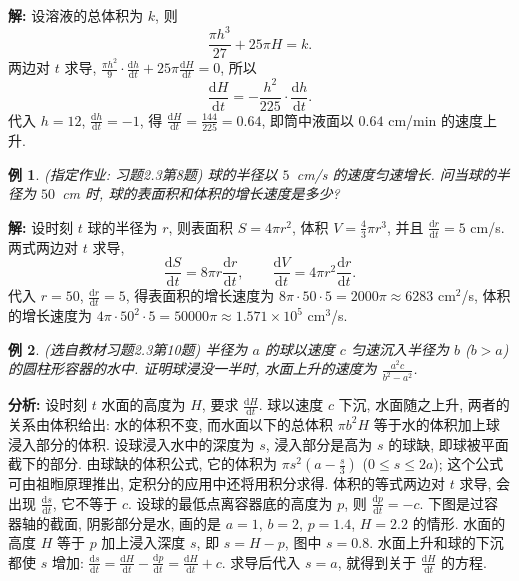 \documentclass[UTF8,openany]{ctexbook}
\theoremstyle{chinesetextbook}
\newtheorem{example}{例}[section]
\newenvironment{cnsolution}{\par\indent\textbf{解:} \ignorespaces}{\par}
\newcommand{\dd}{\mathrm d}
\begin{document}
\begin{cnsolution}
设溶液的总体积为 $k$, 则
\[
\frac{\pi h^3}{27}+25\pi H=k.
\]
两边对 $t$ 求导, $\displaystyle\frac{\pi h^2}9\cdot\frac{\dd h}{\dd t}+25\pi\frac{\dd H}{\dd t}=0$, 所以
\[
\frac{\dd H}{\dd t}=-\frac{h^2}{225}\cdot\frac{\dd h}{\dd t}.
\]
代入 $h=12$, $\displaystyle\frac{\dd h}{\dd t}=-1$, 得 $\displaystyle\frac{\dd H}{\dd t}=\frac{144}{225}=0.64$, 即筒中液面以 $0.64$ cm/min 的速度上升.
\end{cnsolution}
\begin{example}\label{ex:c2-h3-8}
\textnormal{(指定作业: 习题2.3第8题)} 球的半径以 $5$~cm/s 的速度匀速增长. 问当球的半径为 $50$~cm 时, 球的表面积和体积的增长速度是多少?
\end{example}
\begin{cnsolution}
设时刻 $t$ 球的半径为 $r$, 则表面积 $S=4\pi r^2$, 体积 $\displaystyle V=\frac43\pi r^3$, 并且 $\displaystyle\frac{\dd r}{\dd t}=5$ cm/s. 两式两边对 $t$ 求导,
\[
\frac{\dd S}{\dd t}=8\pi r\frac{\dd r}{\dd t},\qquad\frac{\dd V}{\dd t}=4\pi r^2\frac{\dd r}{\dd t}.
\]
代入 $r=50$, $\displaystyle\frac{\dd r}{\dd t}=5$, 得表面积的增长速度为 $8\pi\cdot50\cdot5=2000\pi\approx6283$ cm$^2$/s, 体积的增长速度为 $4\pi\cdot50^2\cdot5=50000\pi\approx1.571\times10^5$ cm$^3$/s.
\end{cnsolution}
\begin{example}\label{ex:c2-h3-10}
\textnormal{(选自教材习题2.3第10题)} 半径为 $a$ 的球以速度 $c$ 匀速沉入半径为 $b$ ($b>a$) 的圆柱形容器的水中. 证明球浸没一半时, 水面上升的速度为 $\displaystyle\frac{a^2c}{b^2-a^2}$.
\end{example}
\par\indent\textbf{分析:} 设时刻 $t$ 水面的高度为 $H$, 要求 $\displaystyle\frac{\dd H}{\dd t}$. 球以速度 $c$ 下沉, 水面随之上升, 两者的关系由体积给出: 水的体积不变, 而水面以下的总体积 $\pi b^2H$ 等于水的体积加上球浸入部分的体积. 设球浸入水中的深度为 $s$, 浸入部分是高为 $s$ 的球缺, 即球被平面截下的部分. 由球缺的体积公式, 它的体积为 $\displaystyle\pi s^2\left(a-\frac s3\right)$ ($0\le s\le2a$); 这个公式可由祖暅原理推出, 定积分的应用中还将用积分求得. 体积的等式两边对 $t$ 求导, 会出现 $\displaystyle\frac{\dd s}{\dd t}$, 它不等于 $c$. 设球的最低点离容器底的高度为 $p$, 则 $\displaystyle\frac{\dd p}{\dd t}=-c$. 下图是过容器轴的截面, 阴影部分是水, 画的是 $a=1$, $b=2$, $p=1.4$, $H=2.2$ 的情形. 水面的高度 $H$ 等于 $p$ 加上浸入深度 $s$, 即 $s=H-p$, 图中 $s=0.8$. 水面上升和球的下沉都使 $s$ 增加: $\displaystyle\frac{\dd s}{\dd t}=\frac{\dd H}{\dd t}-\frac{\dd p}{\dd t}=\frac{\dd H}{\dd t}+c$. 求导后代入 $s=a$, 就得到关于 $\displaystyle\frac{\dd H}{\dd t}$ 的方程.
\end{document}
